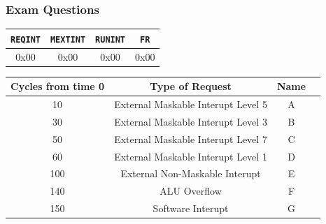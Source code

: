 \begin{frame}
    \frametitle{Exam Questions}
    \begin{table}[]
        \begin{tabular}{|c|c|c|c|}
            \hline
            \texttt{REQINT} & \texttt{MEXTINT} & \texttt{RUNINT} & \texttt{FR} \\ \hline
            0x00 & 0x00 & 0x00 & 0x00 \\ \hline
        \end{tabular}
    \end{table}

    \begin{table}[]
        \begin{tabular}{|c|c|c|c|}
            \hline
            Cycles from time 0 & Type of Request & Name \\ \hline
            10 & External Maskable Interupt Level 5 & A \\ \hline
            30 & External Maskable Interupt Level 3 & B \\ \hline
            50 & External Maskable Interupt Level 7 & C \\ \hline
            60 & External Maskable Interupt Level 1 & D \\ \hline
            100 & External Non-Maskable Interupt & E \\ \hline
            140 & ALU Overflow & F \\ \hline
            150 & Software Interupt & G \\ \hline
        \end{tabular}
    \end{table}
\end{frame}



